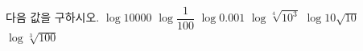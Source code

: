 다음 값을 구하시오.
 $\log 10000$
 $\log\dfrac{1}{100}$
 $\log 0.001$
 $\log\sqrt[4]{10^3}$
 $\log 10\sqrt{10}$
 $\log\sqrt[3]{100}$
